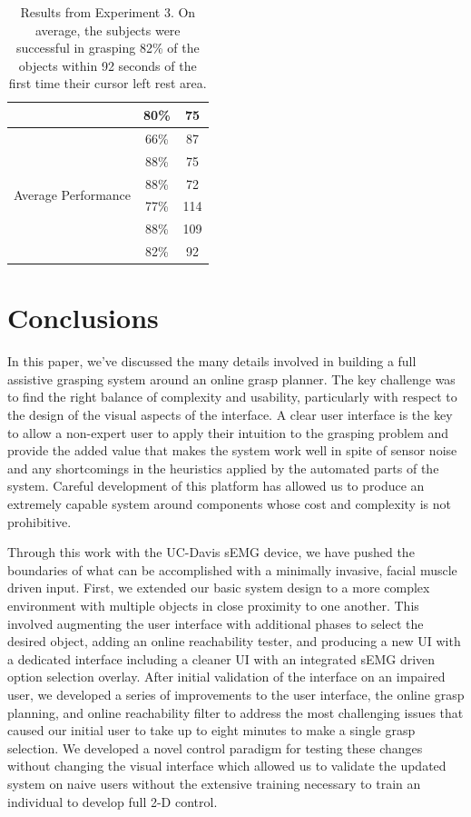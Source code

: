 \begin{table}[t]
\begin{minipage}[!t]{.4\textwidth}
\begin{tabular}[t!]{ | c c c | }
& 80\% & 75\\\hline 
\multirow{6}{*}{\begin{minipage}[t]{0.2\columnwidth}Average Performance\end{minipage}} & 66\% & 87 \\
& 88\% & 75 \\
& 88\% & 72 \\
& 77\% & 114 \\
& 88\% &  109\\ 
& 82\% & 92\\\hline 
\end{tabular}
\end{minipage}
\caption{Results from Experiment 3. On average, the subjects were successful in grasping 82\% of the objects within 92 seconds of the first time their cursor left rest area.}
\label{tab:results_3}
\end{table}

\section{Conclusions}
In this paper, we've discussed the many details involved in building a full assistive grasping system around an online grasp planner. The key challenge was to find the right balance of complexity and usability, particularly with respect to the design of the visual aspects of the interface. A clear user interface is the key to allow a non-expert user to apply their intuition to the grasping problem and provide the added value that makes the system work well in spite of sensor noise and any shortcomings in the heuristics applied by the automated parts of the system. Careful development of this platform has allowed us to produce an extremely capable system around components whose cost and complexity is not prohibitive. 

Through this work with the UC-Davis sEMG device, we have pushed the boundaries of what can be accomplished with a minimally invasive, facial muscle driven input. First, we extended our basic system design to a more complex environment with multiple objects in close proximity to one another. This involved augmenting the user interface with additional phases to select the desired object, adding an online reachability tester, and producing a new UI with a dedicated interface including a cleaner UI with an integrated sEMG driven option selection overlay. After initial validation of the interface on an impaired user, we developed a series of improvements to the user interface, the online grasp planning, and online reachability filter to address the most challenging issues that caused our initial user to take up to eight minutes to make a single grasp selection. We developed a novel control paradigm for testing these changes without changing the visual interface which allowed us to validate the updated system on naive users without the extensive training necessary to train an individual to develop full 2-D control. 

